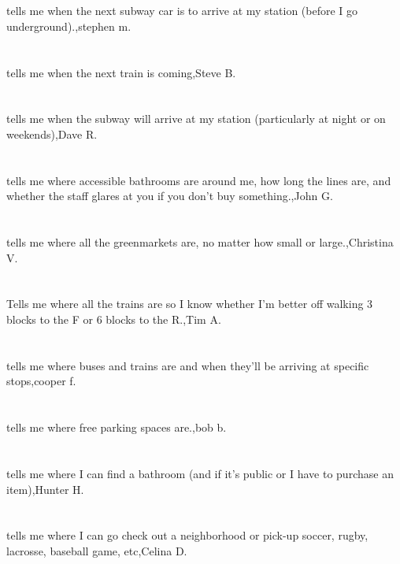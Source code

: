 \section{}tells me when the next subway car is to arrive at my station (before I go underground).,stephen m.	
\section{}tells me when the next train is coming,Steve B.
\section{}tells me when the subway will arrive at my station (particularly at night or on weekends),Dave R.
\section{}tells me where accessible bathrooms are around me, how long the lines are, and whether the staff glares at you if you don't buy something.,John G.
\section{}tells me where all the greenmarkets are, no matter how small or large.,Christina  V.
\section{}Tells me where all the trains are so I know whether I'm better off walking 3 blocks to the F or 6 blocks to the R.,Tim A.
\section{}tells me where buses and trains are and when they'll be arriving at specific stops,cooper f.
\section{}tells me where free parking spaces are.,bob b.
\section{}tells me where I can   find a bathroom (and if it's public or I have to purchase an item),Hunter H.
\section{}tells me where I can go check out a neighborhood or pick-up soccer, rugby, lacrosse, baseball game, etc,Celina D.
